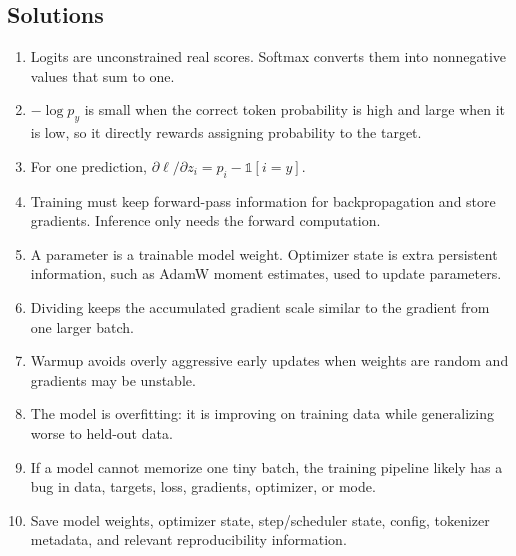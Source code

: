 \subsection*{Solutions}

\begin{enumerate}
  \item Logits are unconstrained real scores. Softmax converts them into nonnegative values that sum to one.
  \item \(-\log p_y\) is small when the correct token probability is high and large when it is low, so it directly rewards assigning probability to the target.
  \item For one prediction, \(\partial \ell/\partial z_i=p_i-\mathbb{1}[i=y]\).
  \item Training must keep forward-pass information for backpropagation and store gradients. Inference only needs the forward computation.
  \item A parameter is a trainable model weight. Optimizer state is extra persistent information, such as AdamW moment estimates, used to update parameters.
  \item Dividing keeps the accumulated gradient scale similar to the gradient from one larger batch.
  \item Warmup avoids overly aggressive early updates when weights are random and gradients may be unstable.
  \item The model is overfitting: it is improving on training data while generalizing worse to held-out data.
  \item If a model cannot memorize one tiny batch, the training pipeline likely has a bug in data, targets, loss, gradients, optimizer, or mode.
  \item Save model weights, optimizer state, step/scheduler state, config, tokenizer metadata, and relevant reproducibility information.
\end{enumerate}
